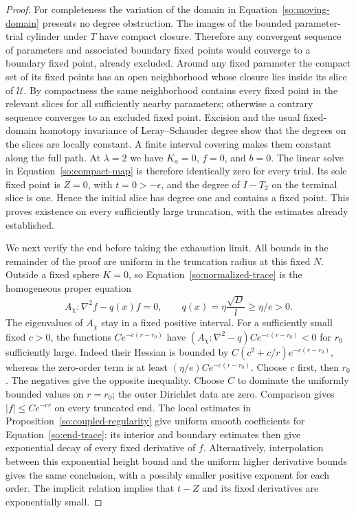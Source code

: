 \begin{proof}
For completeness the variation of the domain in
Equation~\ref{so:moving-domain} presents no degree obstruction.
The images of the bounded parameter-trial cylinder under $T$ have
compact closure.  Therefore any convergent sequence of parameters
and associated boundary fixed points would converge to a boundary
fixed point, already excluded.  Around any fixed parameter the compact
set of its fixed points has an open neighborhood whose closure lies
inside its slice of $\mathcal U$.  By compactness the same neighborhood
contains every fixed point in the relevant slices for all sufficiently
nearby parameters; otherwise a contrary sequence converges to an
excluded fixed point.  Excision and the usual fixed-domain homotopy
invariance of Leray--Schauder degree show that the degrees on the
slices are locally constant.  A finite interval covering makes them
constant along the full path.
At $\lambda=2$ we have $K_a=0$, $f=0$, and $b=0$.  The linear solve
in Equation~\ref{so:compact-map} is therefore identically zero for
every trial.  Its sole fixed point is $Z=0$, with $t=0>-\epsilon$,
and the degree of $I-T_2$ on the terminal slice is one.  Hence the
initial slice has degree one and contains a fixed point.  This proves
existence on every sufficiently large truncation, with the estimates
already established.

We next verify the end before taking the exhaustion limit.  All
bounds in the remainder of the proof are uniform in the truncation
radius at this fixed $N$.  Outside a fixed sphere $K=0$, so
Equation~\ref{so:normalized-trace} is the homogeneous proper equation
\begin{equation}\label{so:end-trace}
 A_\chi:\nabla^2 f-q(x)f=0,\qquad
 q(x)=\eta\frac{\sqrt D}{l}\ge\eta/e>0.
\end{equation}
The eigenvalues of $A_\chi$ stay in a fixed positive interval.
For a sufficiently small fixed $c>0$, the functions
$C e^{-c(r-r_0)}$ have
$(A_\chi:\nabla^2-q)C e^{-c(r-r_0)}<0$ for $r_0$ sufficiently large.
Indeed their Hessian is bounded by
$C(c^2+c/r)e^{-c(r-r_0)}$, whereas the zero-order term is at least
$(\eta/e)C e^{-c(r-r_0)}$.  Choose $c$ first, then $r_0$.
The negatives give the opposite inequality.  Choose $C$ to dominate
the uniformly bounded values on $r=r_0$; the outer Dirichlet data
are zero.  Comparison gives $|f|\le Ce^{-cr}$ on every truncated end.
The local estimates in Proposition~\ref{so:coupled-regularity} give
uniform smooth coefficients for Equation~\ref{so:end-trace}; its
interior and boundary estimates then give exponential decay of every
fixed derivative of $f$.  Alternatively, interpolation between this
exponential height bound and the uniform higher derivative bounds
gives the same conclusion, with a possibly smaller positive exponent
for each order.  The implicit relation implies that $t-Z$ and its
fixed derivatives are exponentially small.


\end{proof}
